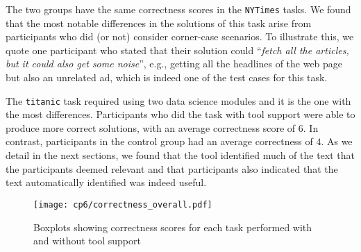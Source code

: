 The two groups have the same correctness scores in the \texttt{NYTimes} tasks.
We found that the most notable differences in the solutions of this task arise from participants who did (or not) consider corner-case scenarios.
To illustrate this, we quote one participant who stated that their solution could ``\textit{fetch all the articles, but it could also get some noise}'',
e.g., getting all the headlines of the web page but also an unrelated ad, which is indeed one of the test cases for this task. 



The \texttt{titanic} task required using two data science modules and it is the one with the most differences. 
Participants who did the task with tool support were able to produce more correct solutions, with an average 
correctness score of $6$. In contrast, participants in the control group had an average correctness of $4$. 
As we detail in the next sections, we found that the tool identified much of the text that the participants deemed relevant
and that participants also indicated that
the text automatically identified was indeed useful.





\begin{figure}
    \centering
    \texttt{[image: cp6/correctness\_overall.pdf]}
    \caption{Boxplots showing correctness scores for each task performed with and without tool support}
    \label{fig:correctness-by-task}
\end{figure}




